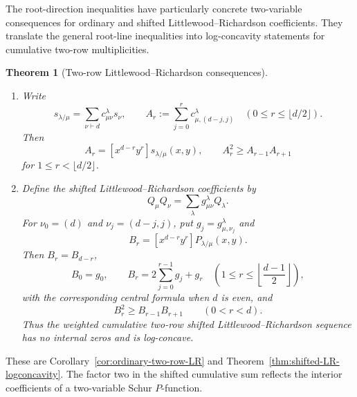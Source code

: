 \documentclass[11pt,a4paper,oneside]{amsart}
\numberwithin{equation}{section}
\newtheorem{theorem}{Theorem}[section]
\theoremstyle{definition}
\theoremstyle{remark}
\begin{document}
The root-direction inequalities have particularly concrete two-variable consequences for ordinary and shifted Littlewood--Richardson coefficients.  They translate the general root-line inequalities into log-concavity statements for cumulative two-row multiplicities.

\begin{theorem}[Two-row Littlewood--Richardson consequences]\label{thm:intro-two-row}
\begin{enumerate}[label=\textup{(\roman*)}]
\item Write
\[
 s_{\lambda/\mu}=\sum_{\nu\vdash d}c_{\mu\nu}^{\lambda}s_\nu,
 \qquad
 A_r:=\sum_{j=0}^r c_{\mu,(d-j,j)}^{\lambda}
 \quad(0\leq r\leq\lfloor d/2\rfloor).
\]
Then
\[
 A_r=[x^{d-r}y^r]s_{\lambda/\mu}(x,y),
 \qquad
 A_r^2\geq A_{r-1}A_{r+1}
\]
for $1\leq r<\lfloor d/2\rfloor$.
\item Define the shifted Littlewood--Richardson coefficients by
\[
 Q_\mu Q_\nu=\sum_\lambda g_{\mu\nu}^{\lambda}Q_\lambda.
\]
For $\nu_0=(d)$ and $\nu_j=(d-j,j)$, put $g_j=g_{\mu,\nu_j}^{\lambda}$ and
\[
 B_r=[x^{d-r}y^r]P_{\lambda/\mu}(x,y).
\]
Then $B_r=B_{d-r}$,
\[
 B_0=g_0,
 \qquad
 B_r=2\sum_{j=0}^{r-1}g_j+g_r
 \quad\left(1\leq r\leq\left\lfloor\frac{d-1}{2}\right\rfloor\right),
\]
with the corresponding central formula when $d$ is even, and
\[
 B_r^2\geq B_{r-1}B_{r+1}
 \qquad(0<r<d).
\]
Thus the weighted cumulative two-row shifted Littlewood--Richardson sequence has no internal zeros and is log-concave.
\end{enumerate}
\end{theorem}

These are Corollary~\ref{cor:ordinary-two-row-LR} and Theorem~\ref{thm:shifted-LR-logconcavity}.  The factor two in the shifted cumulative sum reflects the interior coefficients of a two-variable Schur $P$-function.
\end{document}
